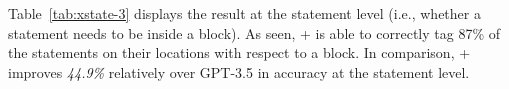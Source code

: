 
Table~\ref{tab:xstate-3} displays the result at the statement level
(i.e., whether a statement needs to be inside a  block). As
seen, {\xblock}+{\xstate} is able to correctly tag 87\% of the
statements on their locations with respect to a  block.  In
comparison, {\xblock}+ {\xstate} improves {\em 44.9\%} relatively over
GPT-3.5 in accuracy at the statement level.



